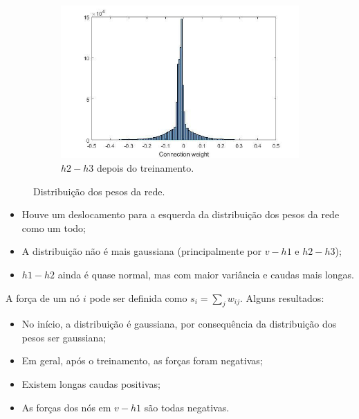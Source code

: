 \documentclass{article}
\begin{document}
\begin{figure}[h!]
\begin{center}
\begin{subfigure}{0.5\textwidth}
                        \includegraphics[scale=0.3]{Images/Weights distribution (5).png}
                        \caption{$h2 - h3$ depois do treinamento.}
                    \end{subfigure}
                \end{center}
                \caption{Distribuição dos pesos da rede.}
                \label{fig6}
            \end{figure}

            \begin{itemize}
                \item Houve um deslocamento para a esquerda da distribuição dos pesos da rede como um todo;
                \item A distribuição não é mais gaussiana (principalmente por $v - h1$ e $h2 - h3$);
                \item $h1 - h2$ ainda é quase normal, mas com maior variância e caudas mais longas.
            \end{itemize}

            A força de um nó $i$ pode ser definida como $s_i = \sum_j w_{ij}$. Alguns resultados:

            \begin{itemize}
                \item No início, a distribuição é gaussiana, por consequência da distribuição dos pesos ser gaussiana;
                \item Em geral, após o treinamento, as forças foram negativas;
                \item Existem longas caudas positivas;
                \item As forças dos nós em $v - h1$ são todas negativas.
            \end{itemize}
\end{document}
